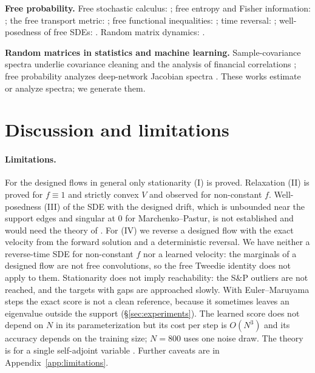 \documentclass[11pt]{article}
\theoremstyle{plain}
\theoremstyle{definition}
\theoremstyle{remark}
\begin{document}
\textbf{Free probability.} Free stochastic calculus: \citet{BianeSpeicher1998,Biane1997,Biane1998};
free entropy and Fisher information: \citet{Voiculescu1993,Voiculescu1998}; the free transport
metric: \citet{BianeVoiculescu2001}; free functional inequalities:
\citet{Biane2003,HiaiPetzUeda2004,LedouxPopescu2009}; time reversal: \citet{Dabrowski2014};
well-posedness of free SDEs: \citet{BianeSpeicher1998,WeiYin2026}. Random matrix dynamics:
\citet{Dyson1962,RogersShi1993,Bru1989}.

\textbf{Random matrices in statistics and machine learning.} Sample-covariance spectra underlie
covariance cleaning \citep{LedoitWolf2012,Bun2017} and the analysis of financial correlations
\citep{Laloux1999,Plerou2002}; free probability analyzes deep-network Jacobian spectra
\citep{Pennington2018}. These works estimate or analyze spectra; we generate them.

\section{Discussion and limitations}\label{sec:limitations}

\paragraph{Limitations.} For the designed flows in general only stationarity (I) is proved. Relaxation (II) is proved for $f\equiv1$
and strictly convex $V$ and observed for non-constant $f$. Well-posedness (III) of the SDE with the designed drift, which is unbounded
near the support edges and singular at $0$ for Marchenko--Pastur, is not established and would need the theory of \citet{WeiYin2026}.
For (IV) we reverse a designed flow with the exact velocity from the forward solution and a deterministic reversal. We have neither a
reverse-time SDE for non-constant $f$ nor a learned velocity: the marginals of a designed flow are not free convolutions, so the free
Tweedie identity does not apply to them. Stationarity does not imply reachability: the S\&P outliers are not reached, and the targets with gaps are approached slowly. With Euler--Maruyama steps the exact score is not a clean reference, because it sometimes leaves an eigenvalue outside the support (\S\ref{sec:experiments}). The learned score does not
depend on $N$ in its parameterization but its cost per step is $O(N^3)$ and its accuracy depends on the training size; $N=800$ uses one
noise draw. The theory is for a single self-adjoint variable \citep{BianeVoiculescu2001}. Further caveats are in Appendix~\ref{app:limitations}.
\end{document}

